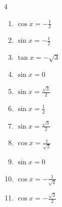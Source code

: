 \begin{multicols}{4}
\begin{enumerate}

  \item $\displaystyle \cos{x}  = -\frac{1}{2}$


  \item $\displaystyle \sin{x}  = -\frac{1}{2}$


  \item $\displaystyle \tan{x}  = -\sqrt{3}$


\columnbreak %

  \item $\displaystyle \sin{x}  = 0$

        \phantom{$\displaystyle x = 0 , \pi$}

  \item $\displaystyle \sin{x}  = \frac{\sqrt{3}}{2}$


  \item $\displaystyle \sin{x}  = \frac{1}{2}$


  \item $\displaystyle \sin{x}  = \frac{\sqrt{3}}{2}$


  \item $\displaystyle \cos{x}  = \frac{1}{\sqrt{2}}$


  \item $\displaystyle \sin{x}  = 0$

        \phantom{$\displaystyle x = 0 , \pi$}

  \item $\displaystyle \cos{x}  = -\frac{1}{\sqrt{2}}$


  \item $\displaystyle \cos{x}  = -\frac{\sqrt{3}}{2}$


\end{enumerate}
\end{multicols}
